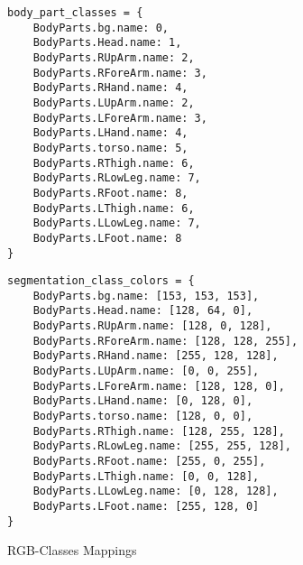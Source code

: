 \begin{figure}

    \fontsmall
\begin{minipage}{0.29\linewidth}
    \begin{Verbatim}[frame=topline,label=Mapping to classes,framesep=1mm]
body_part_classes = {
    BodyParts.bg.name: 0,
    BodyParts.Head.name: 1,
    BodyParts.RUpArm.name: 2,
    BodyParts.RForeArm.name: 3,
    BodyParts.RHand.name: 4,
    BodyParts.LUpArm.name: 2,
    BodyParts.LForeArm.name: 3,
    BodyParts.LHand.name: 4,
    BodyParts.torso.name: 5,
    BodyParts.RThigh.name: 6,
    BodyParts.RLowLeg.name: 7,
    BodyParts.RFoot.name: 8,
    BodyParts.LThigh.name: 6,
    BodyParts.LLowLeg.name: 7,
    BodyParts.LFoot.name: 8
}
    \end{Verbatim}
\end{minipage}\hfill
\begin{minipage}{0.49\linewidth}
    \begin{Verbatim}[frame=topline,label=Mapping to RGB values, framesep=1mm]
segmentation_class_colors = {
    BodyParts.bg.name: [153, 153, 153],
    BodyParts.Head.name: [128, 64, 0],
    BodyParts.RUpArm.name: [128, 0, 128],
    BodyParts.RForeArm.name: [128, 128, 255],
    BodyParts.RHand.name: [255, 128, 128],
    BodyParts.LUpArm.name: [0, 0, 255],
    BodyParts.LForeArm.name: [128, 128, 0],
    BodyParts.LHand.name: [0, 128, 0],
    BodyParts.torso.name: [128, 0, 0],
    BodyParts.RThigh.name: [128, 255, 128],
    BodyParts.RLowLeg.name: [255, 255, 128],
    BodyParts.RFoot.name: [255, 0, 255],
    BodyParts.LThigh.name: [0, 0, 128],
    BodyParts.LLowLeg.name: [0, 128, 128],
    BodyParts.LFoot.name: [255, 128, 0]
}
    \end{Verbatim}

\end{minipage}
    \caption{RGB-Classes Mappings}
    \label{fig:rgb-mappings}
    \end{figure}


